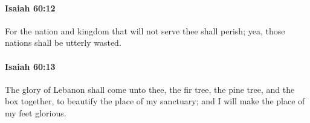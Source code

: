 		\paragraph{Isaiah 60:12} %
			\label{ISAIAH-60-12}

			For the nation and kingdom that will not serve thee shall perish; yea, those nations shall be utterly wasted.


		\paragraph{Isaiah 60:13} %
			\label{ISAIAH-60-13}

			The glory of Lebanon shall come unto thee, the fir tree, the pine tree, and the box together, to beautify the place of my sanctuary; and I will make the place of my feet glorious.


